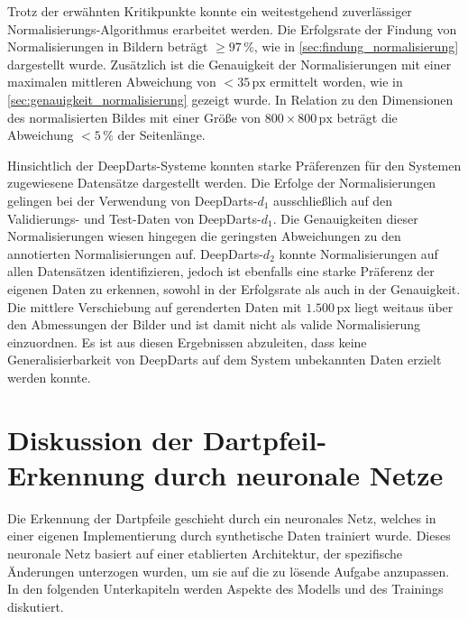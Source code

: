 Trotz der erwähnten Kritikpunkte konnte ein weitestgehend zuverlässiger Normalisierungs-Algorithmus erarbeitet werden. Die Erfolgsrate der Findung von Normalisierungen in Bildern beträgt $\geq 97\,\%$, wie in \autoref{sec:findung_normalisierung} dargestellt wurde. Zusätzlich ist die Genauigkeit der Normalisierungen mit einer maximalen mittleren Abweichung von $<35\,\text{px}$ ermittelt worden, wie in \autoref{sec:genauigkeit_normalisierung} gezeigt wurde. In Relation zu den Dimensionen des normalisierten Bildes mit einer Größe von $800 \times 800\,\text{px}$ beträgt die Abweichung $<5\,\%$ der Seitenlänge.

Hinsichtlich der DeepDarts-Systeme konnten starke Präferenzen für den Systemen zugewiesene Datensätze dargestellt werden. Die Erfolge der Normalisierungen gelingen bei der Verwendung von DeepDarts-$d_1$ ausschließlich auf den Validierungs- und Test-Daten von DeepDarts-$d_1$. Die Genauigkeiten dieser Normalisierungen wiesen hingegen die geringsten Abweichungen zu den annotierten Normalisierungen auf. DeepDarts-$d_2$ konnte Normalisierungen auf allen Datensätzen identifizieren, jedoch ist ebenfalls eine starke Präferenz der eigenen Daten zu erkennen, sowohl in der Erfolgsrate als auch in der Genauigkeit. Die mittlere Verschiebung auf gerenderten Daten mit $1.500\,\text{px}$ liegt weitaus über den Abmessungen der Bilder und ist damit nicht als valide Normalisierung einzuordnen. Es ist aus diesen Ergebnissen abzuleiten, dass keine Generalisierbarkeit von DeepDarts auf dem System unbekannten Daten erzielt werden konnte.



\section{Diskussion der Dartpfeil-Erkennung durch neuronale Netze}
\label{sec:diskussion:ki}

Die Erkennung der Dartpfeile geschieht durch ein neuronales Netz, welches in einer eigenen Implementierung durch synthetische Daten trainiert wurde. Dieses neuronale Netz basiert auf einer etablierten Architektur, der spezifische Änderungen unterzogen wurden, um sie auf die zu lösende Aufgabe anzupassen. In den folgenden Unterkapiteln werden Aspekte des Modells und des Trainings diskutiert.

